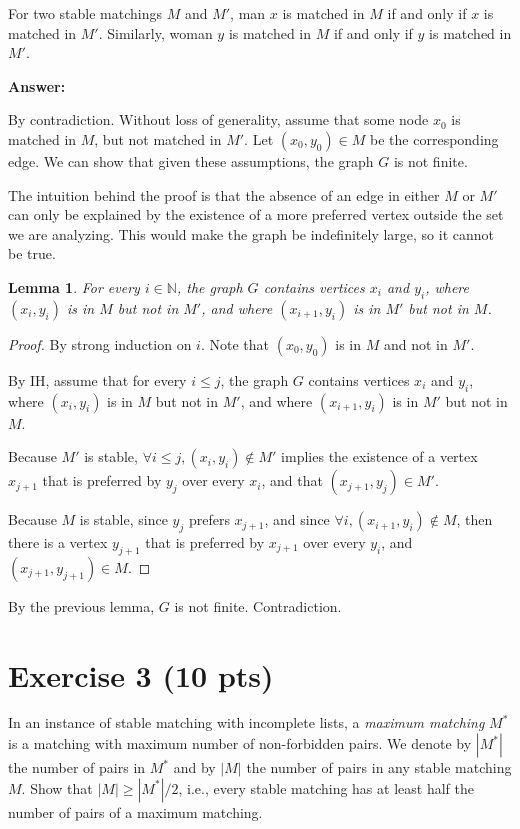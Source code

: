 \documentclass{article}
\newtheorem{mylemma}{\textbf{Lemma}}
\begin{document}
For two stable matchings $M$ and $M'$, man $x$ is matched in $M$ if and only if $x$ is matched in $M'$. Similarly, woman $y$ is matched in $M$ if and only if $y$ is matched in $M'$.

\bigskip \noindent \textbf{Answer:}

By contradiction. Without loss of generality, assume that some node $x_0$ is matched in $M$, but not matched in $M'$. Let $(x_0, y_0) \in M$ be the corresponding edge. We can show that given these assumptions, the graph $G$ is not finite.

The intuition behind the proof is that the absence of an edge in either $M$ or $M'$ can only be explained by the existence of a more preferred vertex outside the set we are analyzing. This would make the graph be indefinitely large, so it cannot be true.

\begin{mylemma}
For every $i \in \mathbb{N}$, the graph $G$ contains vertices $x_i$ and $y_i$, where $(x_i, y_i)$ is in $M$ but not in $M'$, and where $(x_{i+1}, y_i)$ is in $M'$ but not in $M$.
\end{mylemma}
\begin{proof}
By strong induction on $i$. Note that $(x_0, y_0)$ is in $M$ and not in $M'$.

By IH, assume that for every $i \le j$, the graph $G$ contains vertices $x_i$ and $y_i$, where $(x_i, y_i)$ is in $M$ but not in $M'$, and where $(x_{i+1}, y_i)$ is in $M'$ but not in $M$.

Because $M'$ is stable, $\forall i \le j, (x_i, y_i) \notin M'$ implies the existence of a vertex $x_{j+1}$ that is preferred by $y_j$ over every $x_i$, and that $(x_{j+1}, y_j) \in M'$.

Because $M$ is stable, since $y_j$ prefers $x_{j+1}$, and since $\forall i, (x_{i+1}, y_i) \notin M$, then there is a vertex $y_{j+1}$ that is preferred by $x_{j+1}$ over every $y_i$, and ${(x_{j+1}, y_{j+1}) \in M}$.
\end{proof}

\noindent By the previous lemma, $G$ is not finite. Contradiction.

\section{Exercise 3 (10 pts)}

In an instance of stable matching with incomplete lists, a \emph{maximum matching} $M^*$ is a matching with maximum number of non-forbidden pairs. We denote by $|M^*|$ the number of pairs in $M^*$ and by $|M|$ the number of pairs in any stable matching $M$. Show that $|M| \ge |M^*|/2$, i.e., every stable matching has at least half the number of pairs of a maximum matching.
\end{document}
